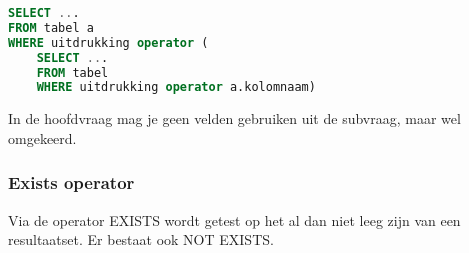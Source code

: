 \documentclass[a4paper,12pt]{article}
\begin{document}
\begin{lstlisting}[language=sql]
SELECT ...
FROM tabel a
WHERE uitdrukking operator (
	SELECT ...
	FROM tabel
	WHERE uitdrukking operator a.kolomnaam)
\end{lstlisting}
In de hoofdvraag mag je geen velden gebruiken uit de subvraag, maar wel omgekeerd.

\subsubsection{Exists operator}
Via de operator EXISTS wordt getest op het al dan niet leeg zijn van een resultaatset. Er bestaat ook NOT EXISTS.
\end{document}
